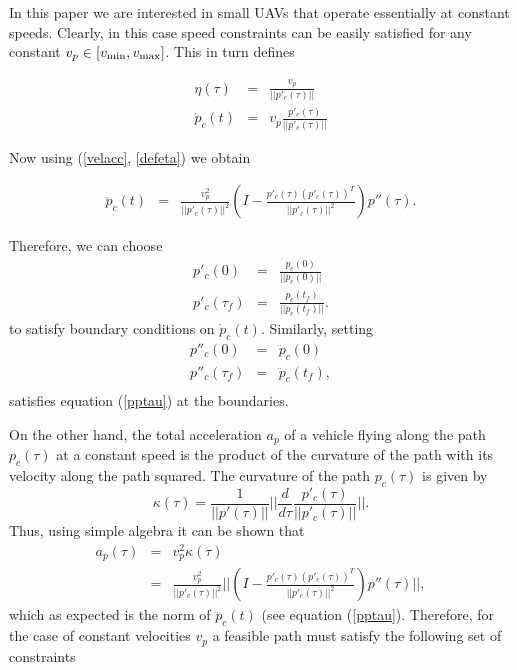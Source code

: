 \documentclass[]{aiaa-tc}%
\begin{document}

In this paper we are interested in small UAVs that operate essentially at constant speeds.
Clearly, in this case speed constraints can be easily satisfied for any constant $ v_p \in [v_{{\rm min}}, v_{{\rm max}} ]$. This in turn defines

\begin{eqnarray}
\eta(\tau) &=&  \frac{v_p}{||p'_c(\tau)||} \label{defeta}\\
\dot p_c(t) &=& v_p \frac{p'_c(\tau)}{|| p'_c(\tau)||} \label{ptau}
\end{eqnarray}

\noindent Now using (\ref{velacc}, \ref{defeta}) we obtain

\begin{eqnarray}
\ddot{p}_c(t)&=&\frac{v_p^2}{||p'_c(\tau)||^2} (I - \frac{p'_c(\tau)
(p'_c(\tau))^T}{||p'_c(\tau)||^2}) p''(\tau). \label{pptau}
\end{eqnarray}

\noindent Therefore, we can choose
\begin{eqnarray}
p'_c(0) &=& \frac{\dot p_c(0)}{||\dot p_c(0)||} \label{ptau0} \\
p'_c(\tau_f) &=& \frac{\dot p_c(t_f)}{||\dot p_c(t_f)||}.
\label{ptauf}
\end{eqnarray}
\noindent to satisfy boundary conditions on $\dot p_c(t)$. Similarly, setting
\begin{eqnarray*}
p''_c(0) &=& \ddot p_c(0) \label{pptau0} \\
p''_c(\tau_f) &=& \ddot p_c(t_f)  \label{pptauf}, \\
\end{eqnarray*}
satisfies equation (\ref{pptau}) at the boundaries.

On the other hand, the total acceleration $a_p$
of a vehicle flying along the path $p_c(\tau)$ at a constant speed is the product of the curvature of
the path with its velocity along the path squared. The curvature of the path $p_c(\tau)$ is given by
\[
\kappa(\tau) = \frac{1}{||p'(\tau)||}
||\frac{d}{d \tau} \frac {p'_c(\tau)}{||p'_c(\tau)||}||.
\]
\noindent Thus, using simple algebra it can be shown that
\begin{eqnarray*}
a_p(\tau) &=& v^2_p \kappa(\tau) \\
    &=&\frac{v_p^2}{||p'_c(\tau)||^2}
||(I - \frac{p'_c(\tau)(p'_c(\tau))^T}{||p'_c(\tau)||^2}) p''(\tau)||,
\end{eqnarray*}
\noindent which as expected is the norm of $\ddot p_c(t)$ (see equation (\ref{pptau}).
Therefore, for the case of constant
velocities $v_p$ a feasible path must satisfy the following set
of constraints
\end{document}
